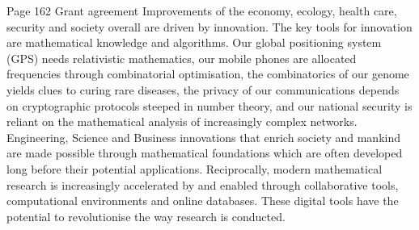 \documentclass[12pt]{amsbook}
\begin{document}
Page 162 Grant agreement
Improvements of the economy, ecology, health care, security and society overall are driven by innovation. The key tools for
innovation are mathematical knowledge and algorithms. Our global positioning system (GPS) needs relativistic mathematics,
our mobile phones are allocated frequencies through combinatorial optimisation, the combinatorics of our genome yields clues
to curing rare diseases, the privacy of our communications depends on cryptographic protocols steeped in number theory,
and our national security is reliant on the mathematical analysis of increasingly complex networks. Engineering, Science and
Business innovations that enrich society and mankind are made possible through mathematical foundations which are often
developed long before their potential applications. Reciprocally, modern mathematical research is increasingly accelerated
by and enabled through collaborative tools, computational environments and online databases. These digital tools have the
potential to revolutionise the way research is conducted.
\end{document}
